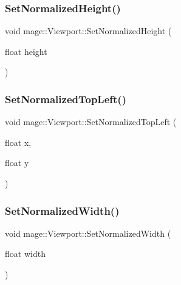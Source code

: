 \hypertarget{structmage_1_1_viewport_a2cb1d0ae7621778b8ef7797b3e0014b5}{}\label{structmage_1_1_viewport_a2cb1d0ae7621778b8ef7797b3e0014b5} 
\subsubsection{\texorpdfstring{Set\+Normalized\+Height()}{SetNormalizedHeight()}}
{\footnotesize\ttfamily void mage\+::\+Viewport\+::\+Set\+Normalized\+Height (\begin{DoxyParamCaption}\item[{float}]{height }\end{DoxyParamCaption})\hspace{0.3cm}{\ttfamily [noexcept]}}

\hypertarget{structmage_1_1_viewport_a3aa0d0353dbb62bce476dee537098a9a}{}\label{structmage_1_1_viewport_a3aa0d0353dbb62bce476dee537098a9a} 
\subsubsection{\texorpdfstring{Set\+Normalized\+Top\+Left()}{SetNormalizedTopLeft()}}
{\footnotesize\ttfamily void mage\+::\+Viewport\+::\+Set\+Normalized\+Top\+Left (\begin{DoxyParamCaption}\item[{float}]{x,  }\item[{float}]{y }\end{DoxyParamCaption})\hspace{0.3cm}{\ttfamily [noexcept]}}

\hypertarget{structmage_1_1_viewport_a15ca5c3fcdf874c52ac648f38784c2b3}{}\label{structmage_1_1_viewport_a15ca5c3fcdf874c52ac648f38784c2b3} 
\subsubsection{\texorpdfstring{Set\+Normalized\+Width()}{SetNormalizedWidth()}}
{\footnotesize\ttfamily void mage\+::\+Viewport\+::\+Set\+Normalized\+Width (\begin{DoxyParamCaption}\item[{float}]{width }\end{DoxyParamCaption})\hspace{0.3cm}{\ttfamily [noexcept]}}


